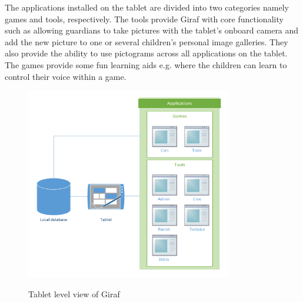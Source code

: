 The applications installed on the tablet are divided into two categories namely games and tools, respectively. The tools provide Giraf with core functionality such as allowing guardians to take pictures with the tablet's onboard camera and add the new picture to one or several children's personal image galleries. They also provide the ability to use pictograms across all applications on the tablet. The games provide some fun learning aids e.g. where the children can learn to control their voice within a game. 

\begin{figure}[htpb]
\includegraphics[width=0.8\textwidth]{img/tablet_level.pdf}
\label{fig:tablet_level}
\caption{Tablet level view of Giraf}
\end{figure}
